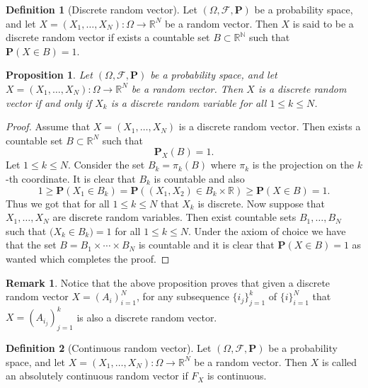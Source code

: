 \documentclass[11pt,a4paper]{article}
\theoremstyle{definition}
\newtheorem{definition}{Definition}[section]
\newtheorem{remark}{Remark}[section]
\theoremstyle{plain}
\newtheorem{proposition}[theorem]{Proposition}
\newcommand{\N}{\mathbb{N}}
\newcommand{\R}{\mathbb{R}}
\begin{document}
  \begin{definition}[Discrete random vector]
    Let $(\Omega, \mathcal F, \mathbf P)$ be a probability space, 
    and let $X = (X_1,\dots,X_N) \colon \Omega \to \R^N$ be a random vector.
    Then $X$ is said to be a discrete random vector if exists a countable
    set $B \subset \R^\N$ such that $\mathbf P(X \in B) = 1$.
  \end{definition}

  \begin{proposition}
    Let $(\Omega, \mathcal F, \mathbf P)$ be a probability space, 
    and let $X = (X_1,\dots,X_N) \colon \Omega \to \R^N$ be a random vector.
    Then $X$ is a discrete random vector if and only if $X_k$ is a discrete
    random variable for all $1 \le k \le N$.
  \end{proposition}
  \begin{proof}
    Assume that $X = (X_1,\dots,X_N)$ is a discrete random vector.
    Then exists a countable set $B \subset \R^N$ such that
    \[
      \mathbf P_X(B) = 1.
    \]
    Let $1 \le k \le N$. Consider the set $B_k = \pi_k(B)$ where $\pi_k$ is the
    projection on the $k$-th coordinate. It is clear that $B_k$ is countable
    and also
    \[
      1 \geq
      \mathbf P(X_1 \in B_k) =
      \mathbf P\left((X_1,X_2) \in B_k \times \R\right) \geq
      \mathbf P(X \in B) =
      1.
    \]
    Thus we got that for all $1 \le k \le N$ that $X_k$ is discrete.
    Now suppose that $X_1,\dots,X_N$ are discrete random variables.
    Then exist countable sets $B_1,\dots,B_N$ such that 
    $\mathbf (X_k \in B_k) = 1$ for all $1 \le k \le N$.
    Under the axiom of choice we have that the set 
    $B = B_1 \times \cdots \times B_N$ is countable and it is clear that
    $\mathbf P(X \in B) = 1$ as wanted which completes the proof.
  \end{proof}
  
  \begin{remark}
    Notice that the above proposition proves that given a discrete random
    vector $X = (A_i)_{i=1}^{N}$, for any subsequence $\{i_j\}_{j=1}^{k}$ of 
    $\{i\}_{i=1}^N$ that $X = (A_{i_j})_{j=1}^k$ is also a discrete random
    vector.
  \end{remark}

  \begin{definition}[Continuous random vector]
    Let $(\Omega, \mathcal F, \mathbf P)$ be a probability space, 
    and let $X = (X_1,\dots,X_N) \colon \Omega \to \R^N$ be a random vector.
    Then $X$ is called an absolutely continuous random vector if $F_X$
    is continuous.
  \end{definition}
  
\end{document}
